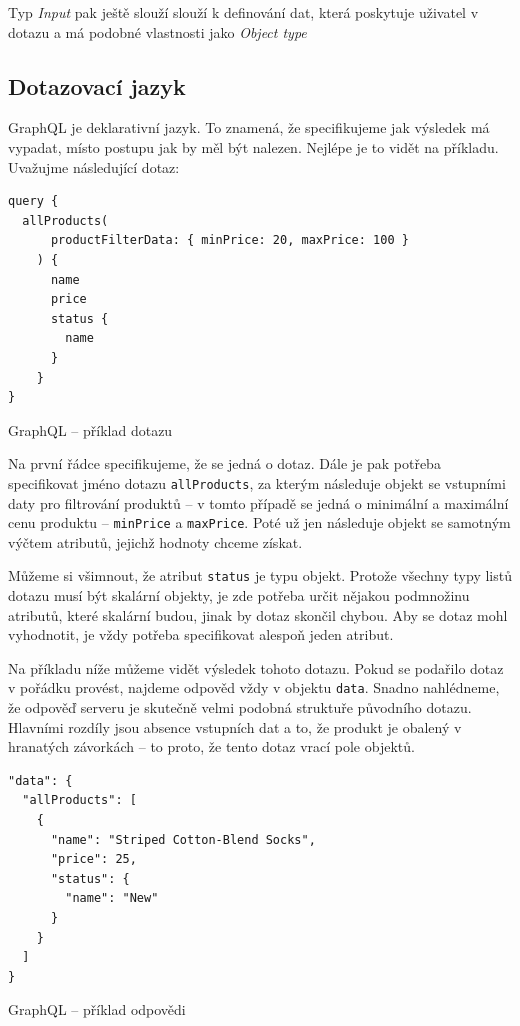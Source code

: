 \documentclass[thesis=M,czech]{FITthesis}[2019/12/23]
\begin{document}
Typ \textit{Input} pak ještě slouží slouží k definování dat, která poskytuje uživatel v dotazu a má podobné vlastnosti jako \textit{Object type}

\subsection{Dotazovací jazyk}
GraphQL je deklarativní jazyk. To znamená, že specifikujeme jak výsledek má vypadat, místo postupu jak by měl být nalezen. Nejlépe je to vidět na příkladu. Uvažujme následující dotaz:

\begin{listing}[H]
\begin{verbatim}
query {
  allProducts(
      productFilterData: { minPrice: 20, maxPrice: 100 }
    ) {
      name
      price
      status {
        name
      }
    }
}
\end{verbatim}
\caption{GraphQL -- příklad dotazu}
\label{lst:graphql_query_example}
\end{listing}

Na první řádce specifikujeme, že se jedná o dotaz. Dále je pak potřeba specifikovat jméno dotazu \texttt{allProducts}, za kterým následuje objekt se vstupními daty pro filtrování produktů -- v tomto případě se jedná o minimální a maximální cenu produktu -- \texttt{minPrice} a \texttt{maxPrice}. Poté už jen následuje objekt se samotným výčtem atributů, jejichž hodnoty chceme získat.

Můžeme si všimnout, že atribut \texttt{status} je typu objekt. Protože všechny typy listů dotazu musí být skalární objekty, je zde potřeba určit nějakou podmnožinu atributů, které skalární budou, jinak by dotaz skončil chybou. Aby se dotaz mohl vyhodnotit, je vždy potřeba specifikovat alespoň jeden atribut.

Na příkladu níže můžeme vidět výsledek tohoto dotazu. Pokud se podařilo dotaz v pořádku provést, najdeme odpověd vždy v objektu \texttt{data}. Snadno nahlédneme, že odpověď serveru je skutečně velmi podobná struktuře původního dotazu. Hlavními rozdíly jsou absence vstupních dat a to, že produkt je obalený v hranatých závorkách -- to proto, že tento dotaz vrací pole objektů.

\begin{listing}[H]
\begin{verbatim}
"data": {
  "allProducts": [
    {
      "name": "Striped Cotton-Blend Socks",
      "price": 25,
      "status": {
        "name": "New"
      }
    }
  ]
}
\end{verbatim}
\caption{GraphQL -- příklad odpovědi}
\label{lst:graphql_example_response}
\end{listing}
\end{document}
